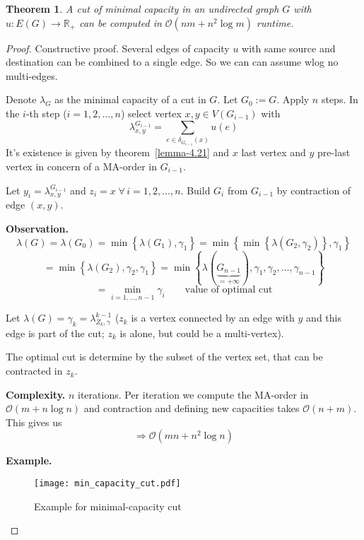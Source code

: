 \documentclass{article}
\newtheorem{theorem}{Theorem}
\newcommand{\set}[1]{\left\{#1\right\}}
\newcommand{\fall}{\;\forall\,}
\begin{document}
\begin{theorem}\label{satz-4.22}
  A cut of minimal capacity in an undirected graph $G$ with $u: E(G) \rightarrow \mathbb{R}_+$ can be computed in $\mathcal{O}(nm + n^2 \log{m})$ runtime.
\end{theorem}

\begin{proof}
  Constructive proof.
  Several edges of capacity $u$ with same source and destination can be combined to a single edge.
  So we can can assume wlog no multi-edges.

  Denote $\lambda_G$ as the minimal capacity of a cut in $G$. Let $G_0 := G$. Apply $n$ steps.
  In the $i$-th step ($i = 1, 2, \ldots, n$) select vertex $x, y \in V(G_{i-1})$ with
  \[
    \lambda^{G_{i-1}}_{x,y} = \sum_{e \in \delta_{G_{i-1}}(x)} u(e)
  \]
  It's existence is given by theorem~\ref{lemma-4.21} and $x$ last vertex and $y$ pre-last vertex in concern of a MA-order in $G_{i-1}$.

  Let $y_i = \lambda^{G_{i-1}}_{x,y}$ and $z_i = x \fall i = 1, 2, \ldots, n$.
  Build $G_i$ from $G_{i-1}$ by contraction of edge $(x, y)$.

  \textbf{Observation.}
    \[
      \lambda(G) = \lambda(G_0) = \min{\set{\lambda(G_1), \gamma_1}}
        = \min{\set{\min{\set{\lambda(G_2, \gamma_2)}, \gamma_1}}}
    \] \[
        = \min{\set{\lambda(G_2), \gamma_2, \gamma_1}}
        = \min{\set{\lambda(\underbrace{G_{n-1}}_{=+\infty}), \gamma_1, \gamma_2, \ldots, \gamma_{n-1}}}
    \] \[
        = \min_{i=1,\ldots,n-1} \gamma_i \qquad \text{value of optimal cut}
    \]
    
    Let $\lambda(G) = \gamma_k = \lambda_{Z_k, \gamma}^{k-1}$ ($z_k$ is a vertex connected by an edge with $y$ and this edge is part of the cut; $z_k$ is alone, but could be a multi-vertex).

    The optimal cut is determine by the subset of the vertex set, that can be contracted in $z_k$.

  \textbf{Complexity.}
    $n$ iterations. Per iteration we compute the MA-order in $\mathcal{O}(m + n \log{n})$ and contraction and defining new capacities takes $\mathcal{O}(n+m)$. This gives us
    \[ \Rightarrow \mathcal{O}(mn + n^2 \log{n}) \]

  \textbf{Example.}

  \begin{figure}[h]
    \begin{center}
      \texttt{[image: min\_capacity\_cut.pdf]}
      \caption{Example for minimal-capacity cut}
    \end{center}
  \end{figure}


\end{proof}
\end{document}
